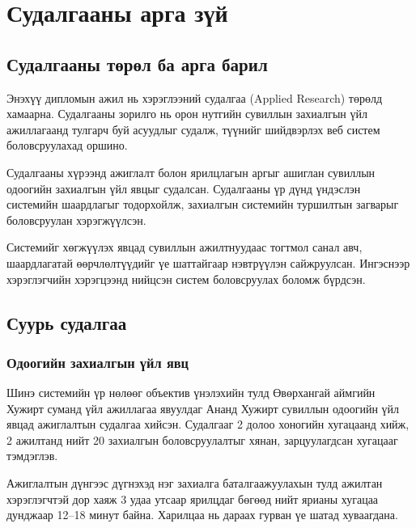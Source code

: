 
\chapter{Судалгааны арга зүй}

\section{Судалгааны төрөл ба арга барил}

Энэхүү дипломын ажил нь хэрэглээний судалгаа (Applied Research) төрөлд хамаарна. Судалгааны зорилго нь орон нутгийн сувиллын захиалгын үйл ажиллагаанд тулгарч буй асуудлыг судалж, түүнийг шийдвэрлэх веб систем боловсруулахад оршино.

Судалгааны хүрээнд ажиглалт болон ярилцлагын аргыг ашиглан сувиллын одоогийн захиалгын үйл явцыг судалсан. Судалгааны үр дүнд үндэслэн системийн шаардлагыг тодорхойлж, захиалгын системийн туршилтын загварыг боловсруулан хэрэгжүүлсэн.

Системийг хөгжүүлэх явцад сувиллын ажилтнуудаас тогтмол санал авч, шаардлагатай өөрчлөлтүүдийг үе шаттайгаар нэвтрүүлэн сайжруулсан. Ингэснээр хэрэглэгчийн хэрэгцээнд нийцсэн систем боловсруулах боломж бүрдсэн.
\section{Суурь судалгаа}

\subsection{Одоогийн захиалгын үйл явц}

Шинэ системийн үр нөлөөг объектив үнэлэхийн тулд Өвөрхангай аймгийн Хужирт суманд үйл ажиллагаа явуулдаг Ананд Хужирт сувиллын одоогийн үйл явцад ажиглалтын судалгаа хийсэн. Судалгааг 2 долоо хоногийн хугацаанд хийж, 2 ажилтанд нийт 20 захиалгын боловсруулалтыг хянан, зарцуулагдсан хугацааг тэмдэглэв.

Ажиглалтын дүнгээс дүгнэхэд нэг захиалга баталгаажуулахын тулд ажилтан хэрэглэгчтэй дор хаяж 3 удаа утсаар ярилцдаг бөгөөд нийт ярианы хугацаа дунджаар 12--18 минут байна. Харилцаа нь дараах гурван үе шатад хуваагдана.

